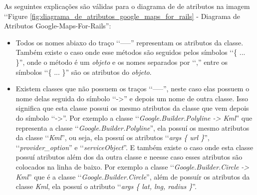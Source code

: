 As seguintes explicações são válidas para o diagrama de de atributos na imagem ‘‘Figure 
\ref{fig:diagrama_de_atributos_google_maps_for_rails} - Diagrama de Atributos Google-Maps-For-Rails'':

\begin{itemize}
 
 \item Todos os nomes abiaxo do traço ‘‘-----'' representam os atributos da classe. Também 
 existe o caso onde esse métodos são seguidos pelos símbolos ‘‘\{ ... \}'', onde o método é um 
 \emph{objeto} e os nomes separados por ‘‘,'' entre os símbolos ‘‘\{ ... \}'' são os atributos
 do \emph{objeto}.
 
 \item Existem classes que não possuem os traços ‘‘-----'', neste caso elas possuem o nome delas
 seguida do símbolo ‘‘->'' e depois um nome de outra classe. Isso significa que esta classe 
 possui os mesmo atributos da classe que vem depois do símbolo ‘‘->''. Por exemplo a 
 classe ‘‘\emph{Google.Builder.Polyline -> Kml}'' que representa a classe 
 ‘‘\emph{Google.Builder.Polyline}'', ela possuí os mesmo atributos da classe
 ‘‘\emph{Kml}'', ou seja, ela possuí os atributos 
 ‘‘\emph{args \{ url \}}'', ‘‘\emph{provider\_option}'' e ‘‘\emph{serviceObject}''. E também existe o caso 
 onde esta classe possuí atributos além dos da outra classe e neesse caso esses 
 atributos são colocados na linha de baixo. Por exemplo a classe 
 ‘‘\emph{Google.Builder.Circle -> Kml}'' que é a classe ‘‘\emph{Google.Builder.Circle}'', além de 
 possuír os atributos da classe \emph{Kml}, ela possuí o atributo 
 ‘‘\emph{args \{ lat, lng, radius \}}''.
 
\end{itemize}

